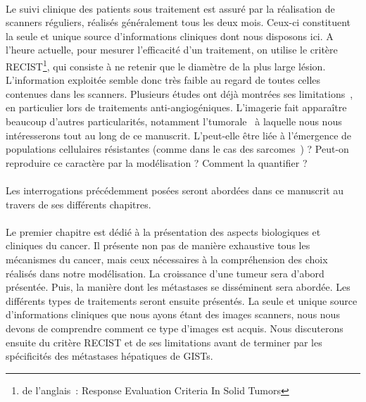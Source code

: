 \documentclass[main.tex]{subfiles}
\begin{document}
\paragraph{}
Le suivi clinique des patients sous traitement est assuré par la réalisation de scanners réguliers, réalisés généralement tous les deux mois. Ceux-ci constituent la seule et unique source d'informations cliniques dont nous disposons ici.  
A l'heure actuelle, pour mesurer l'efficacité d'un traitement, on %
utilise le critère RECIST\footnote{de l'anglais~: Response Evaluation Criteria In Solid Tumors}, qui consiste à ne retenir %
que le diamètre de la plus large lésion. 
L'information exploitée %
semble donc très faible au regard de toutes celles contenues dans les scanners. 
Plusieurs études ont déjà montrées ses limitations~\cite{benjamin2007we}, en particulier lors de traitements anti-angiogéniques. L'imagerie fait apparaître beaucoup d'autres particularités, notamment l'\hetero tumorale~\cite{heppner1984tumor,chabat2003obstructive} à laquelle nous nous intéresserons tout au long de ce manuscrit. L'\hetero peut-elle être liée à l'émergence de populations cellulaires résistantes (comme dans le cas des sarcomes~\cite{eary2008spatial}) ? Peut-on reproduire ce caractère par la modélisation ? Comment la quantifier ?



\paragraph{}
Les interrogations précédemment posées seront abordées dans ce manuscrit au travers de ses différents chapitres. 

\paragraph{}
Le premier chapitre est dédié à la présentation des aspects biologiques et cliniques du cancer.  
Il présente non pas de manière exhaustive tous les mécanismes du cancer, mais ceux nécessaires à la compréhension des choix réalisés dans notre modélisation. 
La croissance d'une tumeur sera d'abord présentée. 
Puis, la manière dont les métastases se disséminent sera abordée. Les différents types de traitements seront ensuite présentés. La seule et unique source d'informations cliniques que nous ayons étant des images scanners, nous nous devons de comprendre comment ce type d'images est acquis. Nous discuterons ensuite du critère RECIST et de ses limitations avant de terminer par les spécificités des métastases hépatiques de GISTs.
\end{document}
